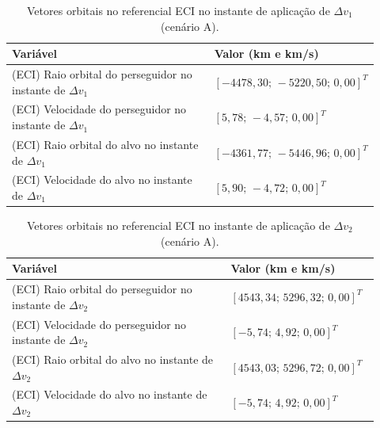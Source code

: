 \begin{table}[H]
\centering
\caption{Vetores orbitais no referencial ECI no instante de aplicação de $\Delta v_1$ (cenário A).}
\label{tab:cap4_eciA_dv1}
\begingroup
\small
\setlength{\tabcolsep}{4pt}
\renewcommand{\arraystretch}{1.15}
\begin{tabular}{|p{0.58\linewidth}|p{0.34\linewidth}|}
\hline
Variável & Valor (km e km/s)\\
\hline
(ECI) Raio orbital do perseguidor no instante de $\Delta v_1$ &
$\left[-4478,30;\,-5220,50;\,0,00\right]^T$\\
\hline
(ECI) Velocidade do perseguidor no instante de $\Delta v_1$ &
$\left[5,78;\,-4,57;\,0,00\right]^T$\\
\hline
(ECI) Raio orbital do alvo no instante de $\Delta v_1$ &
$\left[-4361,77;\,-5446,96;\,0,00\right]^T$\\
\hline
(ECI) Velocidade do alvo no instante de $\Delta v_1$ &
$\left[5,90;\,-4,72;\,0,00\right]^T$\\
\hline
\end{tabular}
\endgroup
\end{table}

\begin{table}[H]
\centering
\caption{Vetores orbitais no referencial ECI no instante de aplicação de $\Delta v_2$ (cenário A).}
\label{tab:cap4_eciA_dv2}
\begingroup
\small
\setlength{\tabcolsep}{4pt}
\renewcommand{\arraystretch}{1.15}
\begin{tabular}{|p{0.58\linewidth}|p{0.34\linewidth}|}
\hline
Variável & Valor (km e km/s)\\
\hline
(ECI) Raio orbital do perseguidor no instante de $\Delta v_2$ &
$\left[4543,34;\,5296,32;\,0,00\right]^T$\\
\hline
(ECI) Velocidade do perseguidor no instante de $\Delta v_2$ &
$\left[-5,74;\,4,92;\,0,00\right]^T$\\
\hline
(ECI) Raio orbital do alvo no instante de $\Delta v_2$ &
$\left[4543,03;\,5296,72;\,0,00\right]^T$\\
\hline
(ECI) Velocidade do alvo no instante de $\Delta v_2$ &
$\left[-5,74;\,4,92;\,0,00\right]^T$\\
\hline
\end{tabular}
\endgroup
\end{table}

